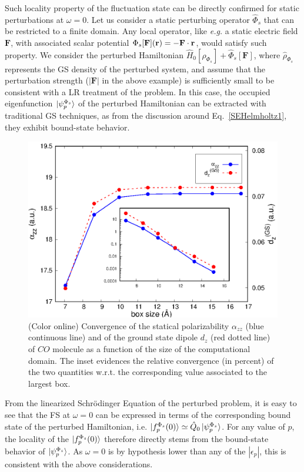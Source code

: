 \documentclass[reprint,aps,prb]{revtex4-1}
\renewcommand{\r}{{\bf r}}
\newcommand{\eps}{\epsilon}
\newcommand{\op}[1]{\hat {#1}}
\newcommand{\dm}{\op{\rho}}
\newcommand{\hnot}{\op{H}_0}
\begin{document}
Such locality property of the fluctuation state can be directly confirmed for static perturbations at $\omega=0$.
Let us consider a static perturbing operator $\op\Phi_s$ that can be restricted to a finite domain. 
Any local operator, like \emph{e.g.} a static electric field $\mathbf F$, with associated scalar potential $\Phi_s[\mathbf F](\r) = -\mathbf F \cdot \r$, would satisfy such property.
We consider the perturbed Hamiltonian $\hnot[\dm_{\Phi_s}] + \op\Phi_s[\mathbf F]$, where $\dm_{\Phi_s}$ represents the GS density of the perturbed system, and assume that the 
perturbation strength ($|\mathbf F|$ in the above example) is sufficiently small to be consistent with a LR treatment of the problem. 
In this case, the occupied eigenfunction $\ket{\psi_p^{\Phi_s}}$ of the perturbed Hamiltonian can be extracted with traditional GS techniques, 
as from the discussion around Eq.~\eqref{SEHelmholtz1}, they exhibit bound-state behavior.
\begin{figure}[t]
\includegraphics[scale=0.68]{Fig1_CO_statPolvsBox.eps}
\caption{\label{co_alphaStatic}(Color online) Convergence of the statical polarizability $\alpha_{zz}$ (blue continuous line) and of the ground state dipole $d_z$ (red dotted line) 
of $CO$ molecule as a function of the size of the computational domain. The inset evidences the relative convergence (in percent) of the two quantities w.r.t. the corresponding value associated to the largest 
box.}
\end{figure}

From the linearized Schr\"odinger Equation of the perturbed problem, it is easy to see that the FS at $\omega=0$ can be expressed
in terms of the corresponding bound state of the perturbed Hamiltonian, i.e.
$\ket{f_p^{\Phi_s}(0)} \simeq \op Q_0 \ket{\psi_p^{\Phi_s}}$.
For any value of $p$, the locality of the $\ket{f_p^{\Phi_s}(0)}$ therefore directly stems from the
bound-state behavior of $\ket{\psi_p^{\Phi_s}}$. As $\omega=0$ is by hypothesis 
lower than any of the $|\eps_p|$, this is consistent with the above considerations.
\end{document}
